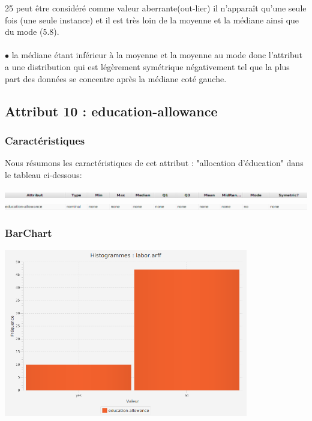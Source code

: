 \documentclass[12pt,a4paper,oneside]{book}
\begin{document}
	25  peut être considéré comme valeur aberrante(out-lier) il n'apparaît qu'une seule fois (une seule instance) et il est très loin de la moyenne et la médiane ainsi que du mode (5.8).\\
	\textbf{ }\\
	$\bullet$ la médiane étant inférieur à la moyenne et la moyenne au mode  donc l'attribut a une distribution qui  est légèrement symétrique négativement tel que la plus part des données se concentre après la médiane coté gauche.
	
	
	\newpage
	
	
	\subsection{Attribut 10 : education-allowance}
	\subsubsection{Caractéristiques}
	Nous résumons les caractéristiques de cet attribut : "allocation d'éducation" dans le tableau ci-dessous:
	\begin{center}
		\includegraphics[width=1\textwidth]{screens/att.png}\\ \includegraphics[width=1\textwidth]{screens/att-9.png}%
		\label{labelname}%
	\end{center}
	
	\subsubsection{BarChart}
	\begin{center}
		\includegraphics[width=0.8\textwidth]{screens/barchart/education-allowance-barchart.png}%
		\label{labelname}%
	\end{center}
	
\end{document}
